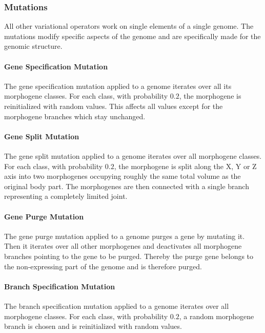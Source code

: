 \documentclass[main]{subfiles}
\begin{document}
\subsubsection{Mutations}

All other variational operators work on single elements of a single genome. %
%
The mutations modify specific aspects of the genome and are specifically made for the genomic structure.

\paragraph{Gene Specification Mutation}

The gene specification mutation applied to a genome iterates over all its morphogene classes. %
%
For each class, with probability $0.2$, the morphogene is reinitialized with random values. %
%
This affects all values except for the morphogene branches which stay unchanged.

\paragraph{Gene Split Mutation}

The gene split mutation applied to a genome iterates over all morphogene classes. %
%
For each class, with probability $0.2$, the morphogene is split along the X, Y or Z axis into two morphogenes occupying roughly the same total volume as the original body part. %
%
The morphogenes are then connected with a single branch representing a completely limited joint.

\paragraph{Gene Purge Mutation}

The gene purge mutation applied to a genome purges a gene by mutating it. %
%
Then it iterates over all other morphogenes and deactivates all morphogene branches pointing to the gene to be purged. %
%
Thereby the purge gene belongs to the non-expressing part of the genome and is therefore purged.

\paragraph{Branch Specification Mutation}

The branch specification mutation applied to a genome iterates over all morphogene classes. %
%
For each class, with probability $0.2$, a random morphogene branch is chosen and is reinitialized with random values. 
\end{document}
